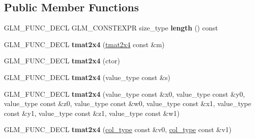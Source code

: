 \subsection*{Public Member Functions}
\begin{DoxyCompactItemize}
\item 
\hypertarget{structglm_1_1detail_1_1tmat2x4_a7aee55f854ec92b8fe7fac54f129b0c5}{}G\+L\+M\+\_\+\+F\+U\+N\+C\+\_\+\+D\+E\+C\+L G\+L\+M\+\_\+\+C\+O\+N\+S\+T\+E\+X\+P\+R size\+\_\+type {\bfseries length} () const \label{structglm_1_1detail_1_1tmat2x4_a7aee55f854ec92b8fe7fac54f129b0c5}

\item 
\hypertarget{structglm_1_1detail_1_1tmat2x4_ae82c79b06f81d05896740f1f2c2795de}{}G\+L\+M\+\_\+\+F\+U\+N\+C\+\_\+\+D\+E\+C\+L {\bfseries tmat2x4} (\hyperlink{structglm_1_1detail_1_1tmat2x4}{tmat2x4} const \&m)\label{structglm_1_1detail_1_1tmat2x4_ae82c79b06f81d05896740f1f2c2795de}

\item 
\hypertarget{structglm_1_1detail_1_1tmat2x4_ac0fb677645f6a217a555408a7005b318}{}G\+L\+M\+\_\+\+F\+U\+N\+C\+\_\+\+D\+E\+C\+L {\bfseries tmat2x4} (ctor)\label{structglm_1_1detail_1_1tmat2x4_ac0fb677645f6a217a555408a7005b318}

\item 
\hypertarget{structglm_1_1detail_1_1tmat2x4_ac408581b742a59fb16a6e800ef6bdc5f}{}G\+L\+M\+\_\+\+F\+U\+N\+C\+\_\+\+D\+E\+C\+L {\bfseries tmat2x4} (value\+\_\+type const \&s)\label{structglm_1_1detail_1_1tmat2x4_ac408581b742a59fb16a6e800ef6bdc5f}

\item 
\hypertarget{structglm_1_1detail_1_1tmat2x4_acbba6d5443699632d8aa730077fdc538}{}G\+L\+M\+\_\+\+F\+U\+N\+C\+\_\+\+D\+E\+C\+L {\bfseries tmat2x4} (value\+\_\+type const \&x0, value\+\_\+type const \&y0, value\+\_\+type const \&z0, value\+\_\+type const \&w0, value\+\_\+type const \&x1, value\+\_\+type const \&y1, value\+\_\+type const \&z1, value\+\_\+type const \&w1)\label{structglm_1_1detail_1_1tmat2x4_acbba6d5443699632d8aa730077fdc538}

\item 
\hypertarget{structglm_1_1detail_1_1tmat2x4_a0cf8f30e8d54baddb57f4091e27f30df}{}G\+L\+M\+\_\+\+F\+U\+N\+C\+\_\+\+D\+E\+C\+L {\bfseries tmat2x4} (\hyperlink{structglm_1_1detail_1_1tvec4}{col\+\_\+type} const \&v0, \hyperlink{structglm_1_1detail_1_1tvec4}{col\+\_\+type} const \&v1)\label{structglm_1_1detail_1_1tmat2x4_a0cf8f30e8d54baddb57f4091e27f30df}


\end{DoxyCompactItemize}
